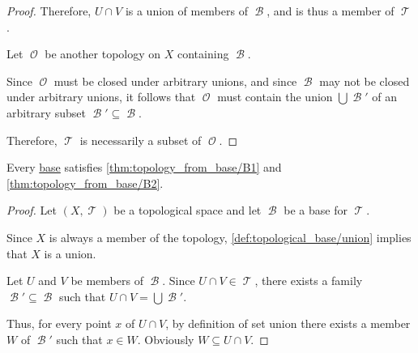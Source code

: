 \begin{proof}
  Therefore, \( U \cap V \) is a union of members of \( \mscrB \), and is thus a member of \( \mscrT \).

   Let \( \mscrO \) be another topology on \( X \) containing \( \mscrB \).

  Since \( \mscrO \) must be closed under arbitrary unions, and since \( \mscrB \) may not be closed under arbitrary unions, it follows that \( \mscrO \) must contain the union \( \bigcup \mscrB' \) of an arbitrary subset \( \mscrB' \subseteq \mscrB \).

  Therefore, \( \mscrT \) is necessarily a subset of \( \mscrO \).
\end{proof}

\begin{proposition}\label{thm:base_can_generate_topology}
  Every \hyperref[def:topological_base]{base} satisfies \ref{thm:topology_from_base/B1} and \ref{thm:topology_from_base/B2}.
\end{proposition}
\begin{proof}
  Let \( (X, \mscrT) \) be a topological space and let \( \mscrB \) be a base for \( \mscrT \).

   Since \( X \) is always a member of the topology, \cref{def:topological_base/union} implies that \( X \) is a union.

   Let \( U \) and \( V \) be members of \( \mscrB \). Since \( U \cap V \in \mscrT \), there exists a family \( \mscrB' \subseteq \mscrB \) such that \( U \cap V = \bigcup \mscrB' \).

  Thus, for every point \( x \) of \( U \cap V \), by definition of set union there exists a member \( W \) of \( \mscrB' \) such that \( x \in W \). Obviously \( W \subseteq U \cap V \).
\end{proof}

